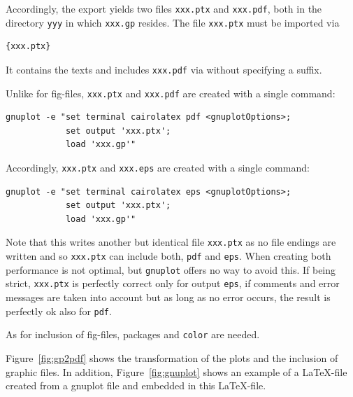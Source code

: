 Accordingly, the export yields two files \texttt{xxx.ptx} and
\texttt{xxx.pdf}, both in the directory \texttt{yyy} 
in which \texttt{xxx.gp} resides. 
The file \texttt{xxx.ptx} must be imported via 
%
\begin{lstlisting}[language=TeX]
{xxx.ptx}
\end{lstlisting}
%
It contains the texts and includes \texttt{xxx.pdf} 
via  without specifying a suffix. 

Unlike for fig-files, 
\texttt{xxx.ptx} and \texttt{xxx.pdf} are created with a single command: 
%
\begin{verbatim}
gnuplot -e "set terminal cairolatex pdf <gnuplotOptions>;
            set output 'xxx.ptx';
            load 'xxx.gp'"
\end{verbatim}

Accordingly, 
\texttt{xxx.ptx} and \texttt{xxx.eps} are created with a single command: 
%
\begin{verbatim}
gnuplot -e "set terminal cairolatex eps <gnuplotOptions>;
            set output 'xxx.ptx';
            load 'xxx.gp'"
\end{verbatim}
%
Note that this writes another but identical file \texttt{xxx.ptx} 
as no file endings are written 
and so \texttt{xxx.ptx} can include both, \texttt{pdf} and \texttt{eps}. 
When creating both performance is not optimal, 
but \texttt{gnuplot} offers no way to avoid this. 
If being strict, 
\texttt{xxx.ptx} is perfectly correct only for output \texttt{eps},
if comments and error messages are taken into account 
but as long as no error occurs, 
the result is perfectly ok also for \texttt{pdf}. 

As for inclusion of fig-files, 
packages  and \texttt{color} are needed. 



Figure~\ref{fig:gp2pdf} shows the transformation of the plots 
and the inclusion of graphic files. 
In addition, Figure~\ref{fig:gnuplot} shows an example of a \LaTeX-file 
created from a gnuplot file 
and embedded in this \LaTeX-file. 

